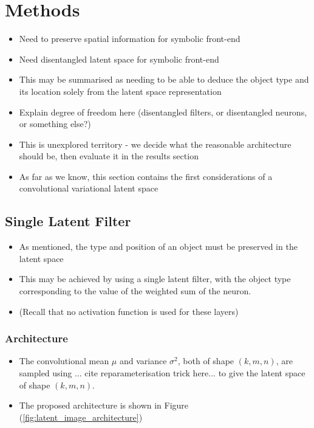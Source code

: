 \chapter{Methods}
\begin{itemize}
\item Need to preserve spatial information for symbolic front-end
\item Need disentangled latent space for symbolic front-end
\item This may be summarised as needing to be able to deduce the object type and its location solely from the latent space representation
\item Explain degree of freedom here (disentangled filters, or disentangled neurons, or something else?)
\item This is unexplored territory - we decide what the reasonable architecture should be, then evaluate it in the results section
\item As far as we know, this section contains the first considerations of a convolutional variational latent space
\end{itemize}

\label{ch:methods}


%
%
%
%
%
\section{Single Latent Filter}

\begin{itemize}
\item As mentioned, the type and position of an object must be preserved in the latent space
\item This may be achieved by using a single latent filter, with the object type corresponding to the value of the weighted sum of the neuron.
\item (Recall that no activation function is used for these layers)
\end{itemize}

\subsection{Architecture}
\begin{itemize}
\item The convolutional mean $\mu$ and variance $\sigma^2$, both of shape $(k, m, n)$, are sampled using ... cite reparameterisation trick here... to give the latent space of shape $(k, m, n)$. 
\item The proposed architecture is shown in Figure (\ref{fig:latent_image_architecture})
\end{itemize}

